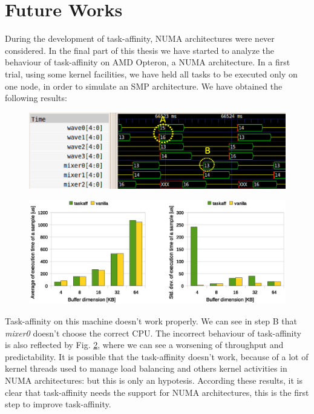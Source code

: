\section{Future Works}

During the development of task-affinity, NUMA architectures were never considered. In the final part of this thesis we have started to analyze the 
behaviour of task-affinity on AMD Opteron, a NUMA architecture. In a first trial, using some kernel facilities, we have held all tasks to be executed only 
on one node, in order to simulate an SMP architecture. We have obtained the following results:

\begin{figure}[htbp]
\centering
\includegraphics[width=\widefigure]{images/results_AMD/final_AMD.eps}
\caption{}
\label{fig:trace_AMD}
\end{figure}

\begin{figure}[htbp]
\centering
\includegraphics[width=\widefigure]{images/results_AMD/time_avg_var_AMD.eps}
\caption{}
\label{fig:time_avg_var_AMD}
\end{figure}

Task-affinity on this machine doesn't work properly. We can see in step B that \textit{mixer0} doesn't choose the correct CPU. The incorrect behaviour of 
task-affinity is also reflected by Fig. \ref{fig:time_avg_var_AMD}, where we can see a worsening of throughput and predictability. It is possible that the 
task-affinity doesn't work, because of a lot of kernel threads used to manage load balancing and others kernel activities in NUMA architectures: but this is 
only an hypotesis. According these results, it is clear that task-affinity needs the support for NUMA architectures, this is the first step to improve 
task-affinity.

